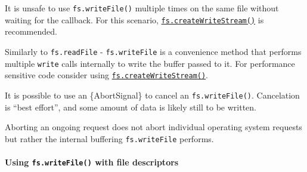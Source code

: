 It is unsafe to use \texttt{fs.writeFile()} multiple times on the same
file without waiting for the callback. For this scenario,
\hyperref[fscreatewritestreampath-options]{\texttt{fs.createWriteStream()}}
is recommended.

Similarly to \texttt{fs.readFile} - \texttt{fs.writeFile} is a
convenience method that performs multiple \texttt{write} calls
internally to write the buffer passed to it. For performance sensitive
code consider using
\hyperref[fscreatewritestreampath-options]{\texttt{fs.createWriteStream()}}.

It is possible to use an \{AbortSignal\} to cancel an
\texttt{fs.writeFile()}. Cancelation is ``best effort'', and some amount
of data is likely still to be written.

\begin{Shaded}
\begin{Highlighting}[]
 \OperatorTok{;}
\NormalTok{ \{ }\NormalTok{ \} } \OperatorTok{;}

\OperatorTok{=}  \NormalTok{()}\OperatorTok{;}
\OperatorTok{=}\OperatorTok{;}
\OperatorTok{=}  \NormalTok{(}\NormalTok{(}\NormalTok{))}\OperatorTok{;}
\NormalTok{(}\OperatorTok{,}\OperatorTok{,}\OperatorTok{,}\KeywordTok{=\textgreater{}}\NormalTok{ \{}
\NormalTok{\})}\OperatorTok{;}
\NormalTok{()}\OperatorTok{;}
\end{Highlighting}
\end{Shaded}

Aborting an ongoing request does not abort individual operating system
requests but rather the internal buffering \texttt{fs.writeFile}
performs.

\paragraph{\texorpdfstring{Using \texttt{fs.writeFile()} with file
descriptors}{Using fs.writeFile() with file descriptors}}\label{using-fs.writefile-with-file-descriptors}

